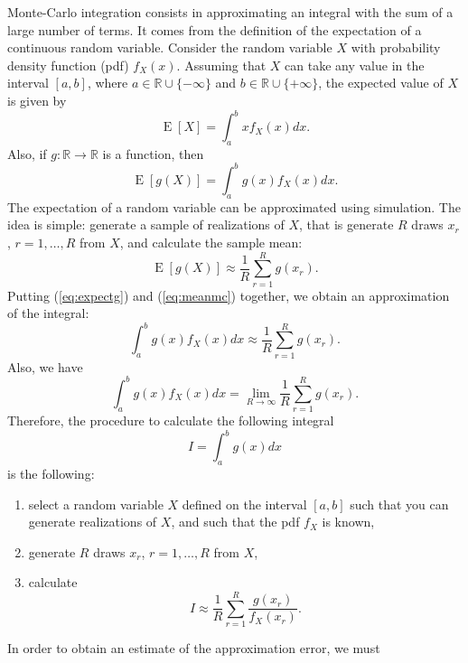 \documentclass[12pt,a4paper]{article}
\newcommand{\req}[1]{(\ref{#1})}
\newcommand{\R}{\mathbb{R}}
\newcommand{\expect}{\operatorname{E}}
\begin{document}
Monte-Carlo integration consists in approximating an integral with the
sum of a
large number of terms. It comes from the definition of the expectation of
a continuous random variable. Consider the random variable $X$ with
probability density function (pdf) $f_X(x)$. Assuming that $X$ can take any
value in the interval $[a,b]$, where $a \in \R \cup \{ -\infty\}$ and $b
\in \R \cup \{+\infty \}$, the expected value of $X$ is given by
\begin{equation}
\label{eq:expect}
\expect[X] = \int_{a}^{b} x f_X(x) dx.
\end{equation}
Also, if $g:\R \to \R$ is a function, then 
\begin{equation}
\label{eq:expectg}
\expect[g(X)] = \int_{a}^{b} g(x) f_X(x) dx.
\end{equation}
The expectation of a random variable can be approximated using
simulation. The idea is simple: generate a sample of realizations of
$X$, that is generate $R$ draws $x_r$, $r=1,\ldots,
R$ from $X$, and calculate the sample mean:
\begin{equation}
\label{eq:meanmc}
\expect[g(X)] \approx \frac{1}{R} \sum_{r=1}^R g(x_r).
\end{equation}
Putting \req{eq:expectg} and \req{eq:meanmc} together, we obtain an
approximation of the integral:
\begin{equation}
 \int_{a}^{b} g(x) f_X(x) dx \approx  \frac{1}{R} \sum_{r=1}^R g(x_r).
\end{equation}
Also, we have 
\begin{equation}
 \int_{a}^{b} g(x) f_X(x) dx = \lim_{R\to\infty}  \frac{1}{R} \sum_{r=1}^R g(x_r).
\end{equation}
Therefore, the procedure to calculate the following integral
\begin{equation}
I = \int_a^b g(x) dx
\end{equation}
is the following:
\begin{enumerate}
\item select a random variable $X$ defined on the interval $[a,b]$ such that you can generate 
realizations of $X$, and such that the pdf $f_X$ is known,
\item generate $R$ draws $x_r$, $r=1,\ldots,R$ from $X$,
\item calculate
\begin{equation}
I \approx \frac{1}{R} \sum_{r=1}^R \frac{g(x_r)}{f_X(x_r)}.
\end{equation}
\end{enumerate}
In order to obtain an estimate of the approximation error, we must
\end{document}
